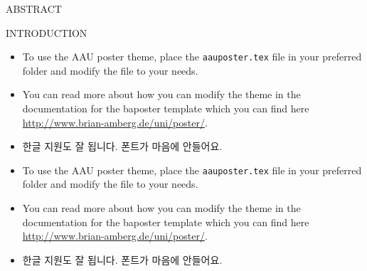 \documentclass[a0paper,portrait]{baposter}
\begin{document}
\begin{poster}
\begin{posterbox}[name=intro,span=2, column=0,row=0, ]{ABSTRACT}
\end{posterbox}

\begin{posterbox}[name=usage,column=0,below=intro]{INTRODUCTION}
\begin{itemize}
  \item To use the AAU poster theme, place the {\tt aauposter.tex} file in your preferred folder and modify the file to your needs.
  \item You can read more about how you can modify the theme in the documentation for the baposter template which you can find here \url{http://www.brian-amberg.de/uni/poster/}.
  \item \footnotesize 한글 지원도 잘 됩니다. 폰트가 마음에 안들어요.
   \item To use the AAU poster theme, place the {\tt aauposter.tex} file in your preferred folder and modify the file to your needs.
  \item You can read more about how you can modify the theme in the documentation for the baposter template which you can find here \url{http://www.brian-amberg.de/uni/poster/}.
  \item \footnotesize 한글 지원도 잘 됩니다. 폰트가 마음에 안들어요.
\end{itemize}
\end{posterbox}


\end{poster}
\end{document}
